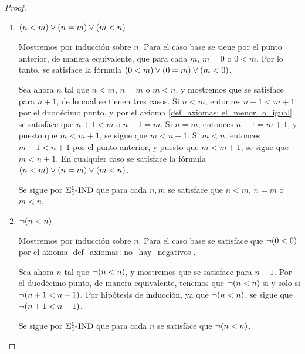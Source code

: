 \begin{proof}
\begin{enumerate}
		Sea $n$ tal que $n\neq 0$ implica $0 < n$, y mostremos que se cumple para $n + 1$. Si $n + 1\neq 0$, entonces tenemos dos casos: $n = 0$ o $n\neq 0$. Si $n = 0$, entonces por el axioma (\ref{def_axiomas: el_menor_o_igual}) se tiene que $n = 0 < 0 + 1 = n + 1$. Si suponemos ahora el segundo caso, entonces por hipótesis de inducción la afirmación $n\neq 0$ implica $0 < n$. Por el mismo axioma (\ref{def_axiomas: el_menor_o_igual}) se tiene que $n < n + 1$, y por transitividad del undécimo     punto se cumple que $0 < n + 1$. En cualquier caso $n + 1\neq 0$ implica $0 < n + 1$.

		Se sigue por $\INDUCCION{\Sigma_{1}^{0}}$ que para cada $n$ se satisface que $n \neq 0$ si y solo si $0 < n$.

		\item $\pa*{n < m}\lor\pa*{n = m}\lor\pa*{m < n}$
		
		Mostremos por inducción sobre $n$. Para el caso base se tiene por el punto anterior, de manera equivalente, que para cada $m$, $m = 0$ o $0 < m$. Por lo tanto, se satisface la fórmula $\pa*{0 < m}\lor\pa*{0 = m}\lor\pa*{m < 0}$.

		Sea ahora $n$ tal que $n < m$, $n = m$ o $m < n$, y mostremos que se satisface para $n + 1$, de lo cual se tienen tres casos. Si $n < m$, entonces $n + 1 < m + 1$ por el duodécimo punto, y por el axioma \ref{def_axiomas: el_menor_o_igual} se satisface que $n + 1 < m$ o $n + 1 = m$. Si $n = m$, entonces $n + 1 = m + 1$, y puesto que $m < m + 1$, se sigue que $m < n + 1$. Si $m < n$, entonces $m + 1 < n + 1$ por el punto anterior, y puesto que $m < m + 1$, se sigue que $m < n + 1$. En cualquier caso se satisface la fórmula $\pa*{n < m}\lor\pa*{n = m}\lor\pa*{m < n}$.

		Se sigue por $\INDUCCION{\Sigma_{1}^{0}}$ que para cada $n, m$ se satisface que $n < m$, $n = m$ o $m < n$.

		\item $\neg\pa*{n < n}$
		
		Mostremos por inducción sobre $n$. Para el caso base se satisface que $\lnot\pa*{0 < 0}$ por el axioma \ref{def_axiomas: no_hay_negativos}.

		Sea ahora $n$ tal que $\lnot\pa*{n < n}$, y mostremos que se satisface para $n + 1$. Por el duodécimo punto, de manera equivalente, tenemos que $\lnot\pa*{n < n}$ si y solo si $\lnot\pa*{n + 1 < n + 1}$. Por hipótesis de inducción, ya que $\lnot\pa*{n < n}$, se sigue que $\lnot\pa*{n + 1 < n + 1}$.

		Se sigue por $\INDUCCION{\Sigma_{1}^{0}}$ que para cada $n$ se satisface que $\lnot\pa*{n < n}$.


\end{enumerate}
\end{proof}
